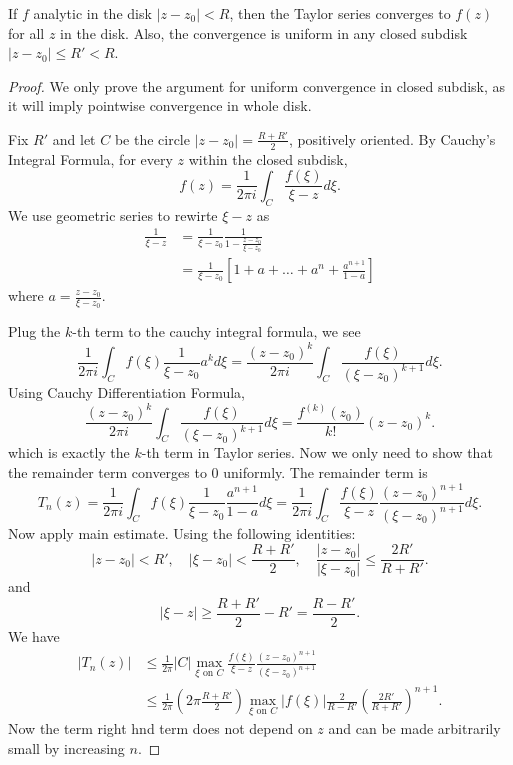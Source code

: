 \begin{theorem}
	If $f$ analytic in the disk $|z - z_0| < R$, then the Taylor series converges to $f(z)$ for all $z$ in the disk. Also, the convergence is uniform in any closed subdisk $|z - z_0| \le R' < R$.
\end{theorem}
\begin{proof}
	We only prove the argument for uniform convergence in closed subdisk, as it will imply pointwise convergence in whole disk.

	Fix $R'$ and let $C$ be the circle $|z - z_0| = \frac{R + R'}{2}$, positively oriented. By Cauchy's Integral Formula, for every  $z$ within the closed subdisk,
	\[
		f(z) = \frac{1}{2 \pi i} \int_C \frac{f(\xi)}{\xi - z} d \xi
	.\] 
	We use geometric series to rewirte $\xi - z$ as
	\begin{align*}
		\frac{1}{\xi - z} &= \frac{1}{\xi - z_0} \frac{1}{1- \frac{z - z_0}{\xi - z_0}}\\
		&= \frac{1}{\xi - z_0}\left[ 1 + a + \ldots + a^n + \frac{a^{n+1}}{1-a} \right]
	\end{align*} 
	where $a = \frac{z-z_0}{\xi - z_0}$.

	Plug the $k$-th term to the cauchy integral formula, we see
	\[
		\frac{1}{2 \pi i} \int _C f(\xi) \frac{1}{\xi - z_0} a^k d \xi = \frac{(z - z_0)^k}{2 \pi i} \int_C \frac{f(\xi)}{(\xi - z_0)^{k+1}}d \xi
	.\] 
	Using Cauchy Differentiation Formula,
\[
		\frac{(z - z_0)^k}{2 \pi i} \int_C \frac{f(\xi)}{(\xi - z_0)^{k+1}}d \xi = \frac{f^{(k)}(z_0)}{k!}(z-z_0)^k
	.\]
	which is exactly the $k$-th term in Taylor series. Now we only need to show that the remainder term converges to $0$ uniformly. The remainder term is
	\[
		T_n(z) = \frac{1}{2 \pi i}\int _C f(\xi)  \frac{1}{\xi - z_0}\frac{a^{n+1}}{1-a} d \xi = \frac{1}{2 \pi i} \int _C \frac{f(\xi)}{\xi - z} \frac{(z-z_0)^{n + 1}}{(\xi - z_0)^{n+1}} d \xi
	.\] 
	Now apply main estimate. Using the following identities:
	\[
		|z - z_0| < R', \quad |\xi - z_0| < \frac{R + R'}{2}, \quad \frac{|z - z_0|}{|\xi - z_0|}\le \frac{2R'}{R + R'}
	.\] 
	and
	\[
		|\xi - z| \ge \frac{R + R'}{2} - R' = \frac{R - R'}{2}
	.\] 
	We have
	\begin{align*}
		|T_n(z)| &\le \frac{1}{2 \pi} |C| \max_{\xi \text{ on }C} \frac{f(\xi)}{\xi - z} \frac{(z-z_0)^{n + 1}}{(\xi - z_0)^{n+1}}\\
			 &\le \frac{1}{2 \pi} \left( 2 \pi \frac{R + R'}{2} \right) 
\max_{\xi \text{ on }C} |f(\xi)| \frac{2}{R - R'} \left( \frac{2 R'}{R + R'} \right) ^{n+1}
	.\end{align*} 
	Now the term right hnd term does not depend on $z$ and can be made arbitrarily small by increasing $n$.
\end{proof}
	
